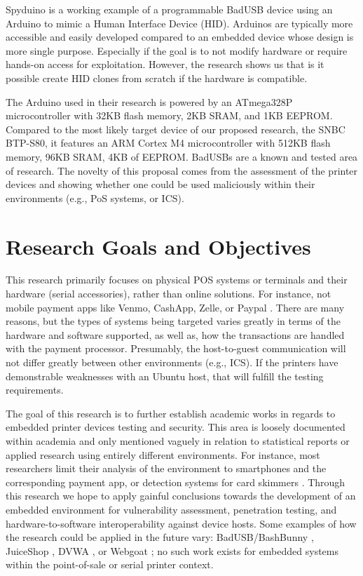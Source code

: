 Spyduino is \autocite{karystinosSpyduinoArduinoHID2019} a working example of a programmable BadUSB device using an Arduino to mimic a Human Interface Device (HID). Arduinos are typically more accessible and easily developed compared to an embedded device whose design is more single purpose. Especially if the goal is to not modify hardware or require hands-on access for exploitation. However, the research shows us that is it possible create HID clones from scratch if the hardware is compatible.

The Arduino used in their research is powered by an ATmega328P microcontroller with 32KB flash memory, 2KB SRAM, and 1KB EEPROM. Compared to the most likely target device of our proposed research, the SNBC BTP-S80, it features an ARM Cortex M4 microcontroller with 512KB flash memory, 96KB SRAM, 4KB of EEPROM. BadUSBs are a known and tested area of research. The novelty of this proposal comes from the assessment of the printer devices and showing whether one could be used maliciously within their environments (e.g., PoS systems, or ICS).

\section{Research Goals and Objectives}  \label{researchgoalsobjectives}

This research primarily focuses on physical POS systems or terminals and their hardware (serial accessories), rather than online solutions. For instance, not mobile payment apps like Venmo, CashApp, Zelle, or Paypal \autocite{wangMobilePaymentSecurity2016}. There are many reasons, but the types of systems being targeted varies greatly in terms of the hardware and software supported, as well as, how the transactions are handled with the payment  processor. Presumably, the host-to-guest communication will not differ greatly
between other environments (e.g., ICS). If the printers have demonstrable weaknesses with an Ubuntu host, that will fulfill the testing requirements.

The goal of this research is to further establish academic works in regards to embedded printer devices testing and security. This area is loosely documented within academia and only mentioned vaguely in relation to statistical reports or applied research using entirely different environments. For instance, most researchers limit their analysis of the environment to smartphones and the corresponding payment app, or detection systems for card skimmers \autocite{scaifeFearReaperCharacterization2018}. Through this research we hope to apply gainful conclusions towards the development of an embedded environment for vulnerability assessment, penetration testing, and hardware-to-software interoperability against device hosts. Some examples of how the research could be applied in the future vary: BadUSB/BashBunny \autocite{hak5BashBunny}, JuiceShop \autocite{OWASPJuiceShop}, DVWA \autocite{woodDAMNVULNERABLEWEB2023}, or Webgoat \autocite{OWASPWebGoatOWASP}; no such work exists for embedded systems within the point-of-sale or serial printer context.

